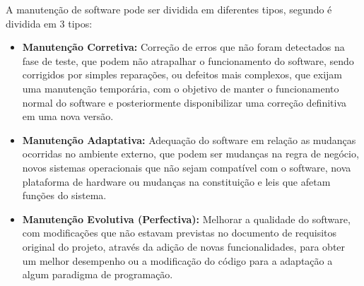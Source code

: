 A manutenção de software pode ser dividida em diferentes tipos, segundo \cite{iansommerville} é dividida em 3 tipos:


\begin{itemize}
    \item \textbf{Manutenção Corretiva:} Correção de erros que não foram detectados na fase de teste, que podem não atrapalhar o funcionamento do software, sendo corrigidos por simples reparações, ou defeitos mais complexos, que exijam uma manutenção temporária, com o objetivo de manter o funcionamento normal do software e posteriormente disponibilizar uma correção definitiva em uma nova versão. 
\end{itemize}
    
\begin{itemize}  
    \item \textbf{Manutenção Adaptativa:} Adequação do software em relação as mudanças ocorridas no ambiente externo, que podem ser mudanças na regra de negócio, novos sistemas operacionais que não sejam compatível com o software, nova plataforma de hardware ou mudanças na constituição e leis que afetam funções do sistema.
\end{itemize}
    
 \begin{itemize}  
    \item \textbf{Manutenção Evolutiva (Perfectiva):} Melhorar a qualidade do software, com modificações que não estavam previstas no documento de requisitos original do projeto, através da adição de novas funcionalidades, para obter um melhor desempenho ou a modificação do código para a adaptação a algum paradigma de programação. 
\end{itemize}
    

